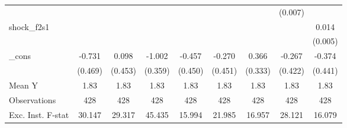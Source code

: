 {\begin{tabular}{l*{8}{c}}
            &                     &                     &                     &                     &                     &                     &     (0.007)         &                     \\
\addlinespace
shock\_f2s1  &                     &                     &                     &                     &                     &                     &                     &       0.014\sym{**} \\
            &                     &                     &                     &                     &                     &                     &                     &     (0.005)         \\
\addlinespace
\_cons      &      -0.731         &       0.098         &      -1.002\sym{**} &      -0.457         &      -0.270         &       0.366         &      -0.267         &      -0.374         \\
            &     (0.469)         &     (0.453)         &     (0.359)         &     (0.450)         &     (0.451)         &     (0.333)         &     (0.422)         &     (0.441)         \\
\midrule
Mean Y      &        1.83         &        1.83         &        1.83         &        1.83         &        1.83         &        1.83         &        1.83         &        1.83         \\
Observations&         428         &         428         &         428         &         428         &         428         &         428         &         428         &         428         \\
Exc. Inst. F-stat&      30.147         &      29.317         &      45.435         &      15.994         &      21.985         &      16.957         &      28.121         &      16.079         \\
\bottomrule
\end{tabular}
}
